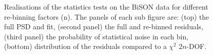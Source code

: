 \begin{figure}[!ht]
	\qquad
	
	\caption{Realisations of the statistics tests on the BiSON data for different re-binning factors (n). The panels of each sub figure are: (top) the full PSD and fit, (second panel) the full and re-binned residuals, (third panel) the probability of statistical noise in each bin, (bottom) distribution of the residuals compared to a $\chi^2$ $2n$-DOF.}
	\label{fig:BiSON_new_symm_stats}
\end{figure}


